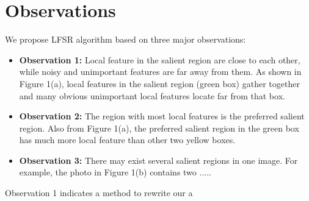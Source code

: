 \section{Observations}

We propose LFSR algorithm based on three major observations:

\begin{itemize}
	
	\item {\bf Observation 1:} Local feature in the salient region are close to each other, while noisy and unimportant features are far away from them. As shown in Figure 1(a), local features in the salient region (green box) gather together and many obvious unimportant local features locate far from that box.

	\item {\bf Observation 2:} The region with most local features is the preferred salient region. Also from Figure 1(a), the preferred salient region in the green box has much more local feature than other two yellow boxes.

	\item {\bf Observation 3:} There may exist several salient regions in one image. For example, the photo in Figure 1(b) contains two .....

\end{itemize}

Observation 1 indicates a method to rewrite our a